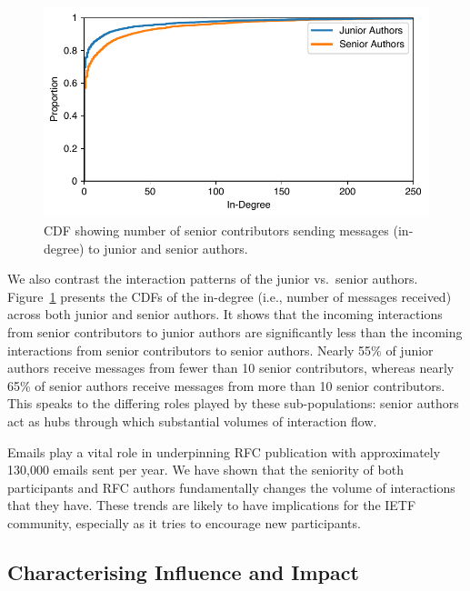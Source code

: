 \documentclass[twocolumn,10pt]{article}
\newlength{\figureWidthOneColumn}
\newcommand{\pb}[1]{\vspace{0.75ex}\noindent{\textbf{#1}}}
\begin{document}
\begin{figure}
  \centering
  \includegraphics[width=\figureWidthOneColumn]{figures-prev/imc-2021/emails/junior_senior_authors_seniormem_indegree.pdf}
  \caption{
    CDF showing number of senior contributors sending messages (in-degree)
    to junior and senior authors.
  }
  \label{fig:junior_senior_indegree_seniormem}
\end{figure}

We also contrast the interaction patterns of the junior vs.\ senior
authors. Figure~\ref{fig:junior_senior_indegree_seniormem} presents the
CDFs of the in-degree (i.e., number of messages received) across both
junior and senior authors. It shows that the incoming interactions from
senior contributors to junior authors are significantly less than the
incoming interactions from senior contributors to senior authors. Nearly
55\% of junior authors receive messages from fewer than 10 senior
contributors, whereas nearly 65\% of senior authors receive messages from
more than 10 senior contributors.  This speaks to the differing roles
played by these sub-populations: senior authors act as hubs through which
substantial volumes of interaction flow.

\pb{Summary:}
Emails play a vital role in underpinning RFC publication with approximately
130,000 emails sent per year. We have shown that the seniority of both
participants and RFC authors fundamentally changes the volume of
interactions that they have. These trends are likely to have implications
for the IETF community, especially as it tries to encourage new
participants.


\subsection{Characterising Influence and Impact}
\label{sec:org-dyn:influence}
\end{document}
